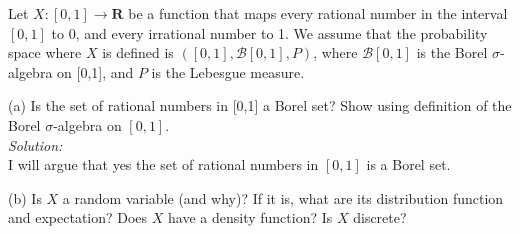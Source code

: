 \documentclass[10pt]{amsart}
\begin{document}
  Let $X: [0,1] \to \mathbf{R}$ be a function that maps every rational number in the interval $[0,1]$ to 0, and every irrational number to 1. We assume that the probability space where $X$ is defined is $([0,1],\mathcal{B}[0,1],P)$, where $\mathcal{B}[0,1]$ is the Borel $\sigma$-algebra on [0,1], and $P$ is the Lebesgue measure. 

(a) Is the set of rational numbers in [0,1] a Borel set? Show using definition of the Borel  $\sigma$-algebra on $[0,1]$. \\
\textit{Solution:} \\
I will argue that yes the set of rational numbers in $[0, 1]$ is a Borel set.

(b) Is $X$ a random variable (and why)? If it is, what are its distribution function and expectation? Does $X$ have a density function? Is $X$ discrete?
\end{document}
